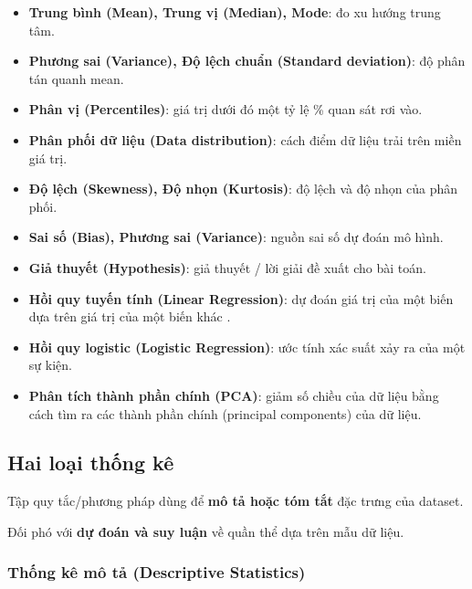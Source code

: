\begin{phuongphap}[title={Danh sách khái niệm quan trọng}]
\begin{itemize}
  \item \textbf{Trung bình (Mean), Trung vị (Median), Mode}: đo xu hướng trung tâm.
  \item \textbf{Phương sai (Variance), Độ lệch chuẩn (Standard deviation)}: độ phân tán quanh mean.
  \item \textbf{Phân vị (Percentiles)}: giá trị dưới đó một tỷ lệ \% quan sát rơi vào.
  \item \textbf{Phân phối dữ liệu (Data distribution)}: cách điểm dữ liệu trải trên miền giá trị.
  \item \textbf{Độ lệch (Skewness), Độ nhọn (Kurtosis)}: độ lệch và độ nhọn của phân phối.
  \item \textbf{Sai số (Bias), Phương sai (Variance)}: nguồn sai số dự đoán mô hình.
  \item \textbf{Giả thuyết (Hypothesis)}: giả thuyết / lời giải đề xuất cho bài toán.
  \item \textbf{Hồi quy tuyến tính (Linear Regression)}: dự đoán giá trị của một biến dựa trên giá trị của một biến khác .
  \item \textbf{Hồi quy logistic (Logistic Regression)}: ước tính xác suất xảy ra của một sự kiện.
  \item \textbf{Phân tích thành phần chính (PCA)}: giảm số chiều của dữ liệu bằng cách tìm ra các thành phần chính (principal components) của dữ liệu.
\end{itemize}
\end{phuongphap}

\subsection{Hai loại thống kê}

\begin{dinhnghia}[title={Thống kê mô tả}]
Tập quy tắc/phương pháp dùng để \textbf{mô tả hoặc tóm tắt} đặc trưng của dataset.
\end{dinhnghia}

\begin{dinhnghia}[title={Thống kê suy luận}]
Đối phó với \textbf{dự đoán và suy luận} về quần thể dựa trên mẫu dữ liệu.
\end{dinhnghia}

\subsubsection{Thống kê mô tả (Descriptive Statistics)}

